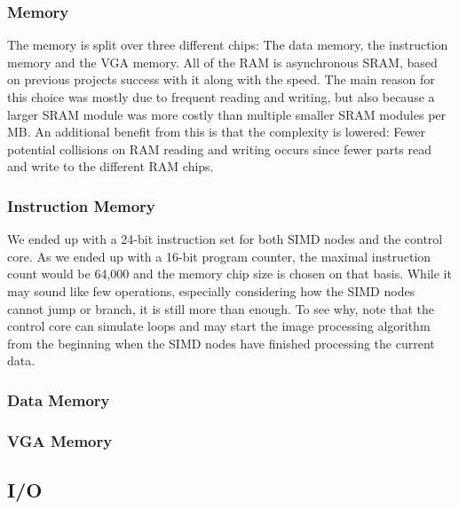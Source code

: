 \subsubsection{Memory}
 The memory is split over three
different chips: The data memory, the instruction memory and the \ac{VGA}
memory. All of the \ac{RAM} is asynchronous \ac{SRAM}, based on previous
projects success with it\cite{berg2011festinalente} along with the speed. The
main reason for this choice was mostly due to frequent reading and writing, but
also because a larger \ac{SRAM} module was more costly than multiple smaller
\ac{SRAM} modules per \ac{MB}. An additional benefit from this is that the
complexity is lowered: Fewer potential collisions on \ac{RAM} reading and
writing occurs since fewer parts read and write to the different \ac{RAM} chips.

\subsubsection*{Instruction Memory}
We ended up with a 24-bit instruction set for both \ac{SIMD} nodes and the
control core. As we ended up with a 16-bit program counter, the maximal
instruction count would be 64,000 and the memory chip size is chosen on that
basis. While it may sound like few operations, especially considering how the
\ac{SIMD} nodes cannot jump or branch, it is still more than enough. To see why,
note that the control core can simulate loops and may start the image processing
algorithm from the beginning when the \ac{SIMD} nodes have finished processing
the current data.

\subsubsection*{Data Memory}

\subsubsection*{VGA Memory}

\subsection{I/O}


